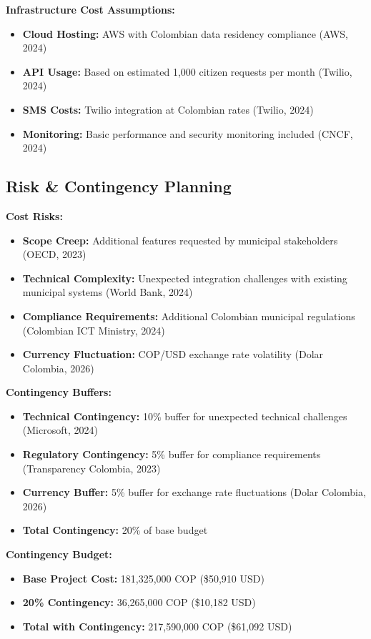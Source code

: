 \documentclass[12pt,a4paper]{article}
\begin{document}
\textbf{Infrastructure Cost Assumptions:}
\begin{itemize}
    \item \textbf{Cloud Hosting:} AWS with Colombian data residency compliance (AWS, 2024)
    \item \textbf{API Usage:} Based on estimated 1,000 citizen requests per month (Twilio, 2024)
    \item \textbf{SMS Costs:} Twilio integration at Colombian rates (Twilio, 2024)
    \item \textbf{Monitoring:} Basic performance and security monitoring included (CNCF, 2024)
\end{itemize}

\subsection{Risk \& Contingency Planning}

\textbf{Cost Risks:}
\begin{itemize}
    \item \textbf{Scope Creep:} Additional features requested by municipal stakeholders (OECD, 2023)
    \item \textbf{Technical Complexity:} Unexpected integration challenges with existing municipal systems (World Bank, 2024)
    \item \textbf{Compliance Requirements:} Additional Colombian municipal regulations (Colombian ICT Ministry, 2024)
    \item \textbf{Currency Fluctuation:} COP/USD exchange rate volatility (Dolar Colombia, 2026)
\end{itemize}

\textbf{Contingency Buffers:}
\begin{itemize}
    \item \textbf{Technical Contingency:} 10\% buffer for unexpected technical challenges (Microsoft, 2024)
    \item \textbf{Regulatory Contingency:} 5\% buffer for compliance requirements (Transparency Colombia, 2023)
    \item \textbf{Currency Buffer:} 5\% buffer for exchange rate fluctuations (Dolar Colombia, 2026)
    \item \textbf{Total Contingency:} 20\% of base budget
\end{itemize}

\textbf{Contingency Budget:}
\begin{itemize}
    \item \textbf{Base Project Cost:} 181,325,000 COP (\$50,910 USD)
    \item \textbf{20\% Contingency:} 36,265,000 COP (\$10,182 USD)
    \item \textbf{Total with Contingency:} 217,590,000 COP (\$61,092 USD)
\end{itemize}
\end{document}
